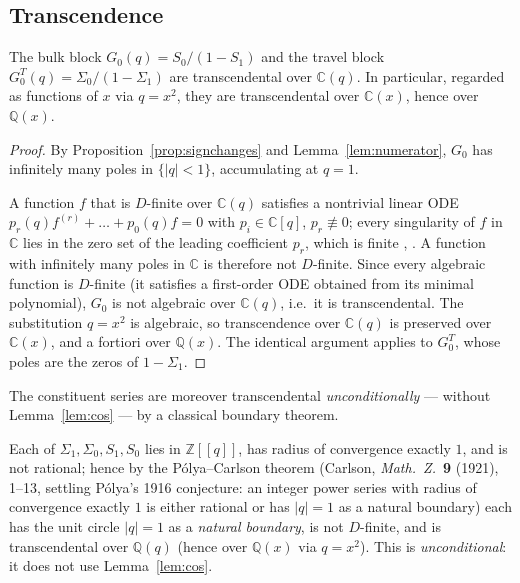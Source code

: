 \subsection{Transcendence}

\begin{theorem}\label{thm:main}
The bulk block $G_0(q)=S_0/(1-S_1)$ and the travel block
$G^{T}_0(q)=\Sigma_0/(1-\Sigma_1)$ are transcendental over $\mathbb C(q)$. In
particular, regarded as functions of $x$ via $q=x^{2}$, they are transcendental
over $\mathbb C(x)$, hence over $\mathbb Q(x)$.
\end{theorem}

\begin{proof}
By Proposition~\ref{prop:signchanges} and Lemma~\ref{lem:numerator}, $G_0$ has
infinitely many poles in $\{|q|<1\}$, accumulating at $q=1$.

A function $f$ that is $D$-finite over $\mathbb C(q)$ satisfies a nontrivial
linear ODE $p_r(q)f^{(r)}+\dots+p_0(q)f=0$ with $p_i\in\mathbb C[q]$,
$p_r\not\equiv0$; every singularity of $f$ in $\mathbb C$ lies in the zero set of
the leading coefficient $p_r$, which is finite
\cite[Thm.~B.IV, \S B.IV]{FlajoletSedgewick}, \cite[\S6.4]{StanleyEC2}. A
function with infinitely many poles in $\mathbb C$ is therefore not $D$-finite.
Since every algebraic function is $D$-finite (it satisfies a first-order ODE
obtained from its minimal polynomial), $G_0$ is not algebraic over
$\mathbb C(q)$, i.e.\ it is transcendental. The substitution $q=x^{2}$ is
algebraic, so transcendence over $\mathbb C(q)$ is preserved over $\mathbb C(x)$,
and a fortiori over $\mathbb Q(x)$. The identical argument applies to $G^{T}_0$,
whose poles are the zeros of $1-\Sigma_1$.
\end{proof}

The constituent series are moreover transcendental \emph{unconditionally} --- without
Lemma~\ref{lem:cos} --- by a classical boundary theorem.

\begin{theorem}\label{thm:blocks}
Each of $\Sigma_1,\Sigma_0,S_1,S_0$ lies in $\mathbb Z[[q]]$, has radius of
convergence exactly $1$, and is not rational; hence by the P\'olya--Carlson theorem
\textup(Carlson, \emph{Math.\ Z.}\ \textbf{9} (1921), 1--13, settling P\'olya's 1916
conjecture: an integer power series with radius of convergence exactly $1$ is either
rational or has $|q|=1$ as a natural boundary\textup) each has the unit circle $|q|=1$
as a \emph{natural boundary}, is not $D$-finite, and is transcendental over
$\mathbb Q(q)$ \textup(hence over $\mathbb Q(x)$ via $q=x^2$\textup). This is
\emph{unconditional}: it does not use Lemma~\ref{lem:cos}.
\end{theorem}

